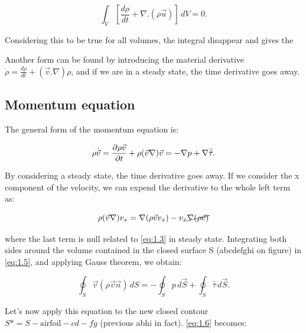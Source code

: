 		\begin{equation}
		\int _V \left[\frac{d \rho}{d t} + \nabla .(\rho \vec{u})\right]\, dV = 0. 
		\end{equation}
		
		Considering this to be true for all volumes, the integral disappear and gives the 
		
		\begin{center}
		\end{center}
		
		Another form can be found by introducing the material derivative $\dot{\rho} = \frac{d\rho}{dt} + (\vec{v}.\nabla )\rho$, and if we are in a steady state, the time derivative goes away. 
		
	\subsection{Momentum equation}
		The general form of the momentum equation is: 
		
		\begin{equation}
		\rho \dot{\vec{v}} = \frac{\D \rho \vec{v}}{\D t} + \rho (\vec{v}\nabla ) \vec{v} = -\nabla p + \nabla \bar{\bar{\tau}}.
		\end{equation}
		
		By considering a steady state, the time derivative goes away. If we consider the x component of the velocity, we can expend the derivative to the whole left term as:
		
		\begin{equation}
		\rho (\vec{v}\nabla ) v_x = \nabla (\rho \vec{v} v_x) - v_x \cancel{\nabla (\rho \vec{v})}
		\label{eq:1.5}
		\end{equation}
		
		where the last term is null related to \eqref{eq:1.3} in steady state. Integrating both sides around the volume contained in the closed surface S (abcdefghi on figure) in \eqref{eq:1.5}, and applying Gauss theorem, we obtain:
		
		\begin{equation}
		\oint _{S} \vec{v} (\rho \vec{v} \vec{n}) \, dS = -\oint _{S} p \, d\vec{S} + \oint _{S} \bar{\bar{\tau}} \, d\vec{S}.
		\label{eq:1.6}
		\end{equation}		 
		
		Let's now apply this equation to the new closed contour $S* = S - \mbox{airfoil} - cd - fg$ (previous abhi in fact). \eqref{eq:1.6} becomes:
		

